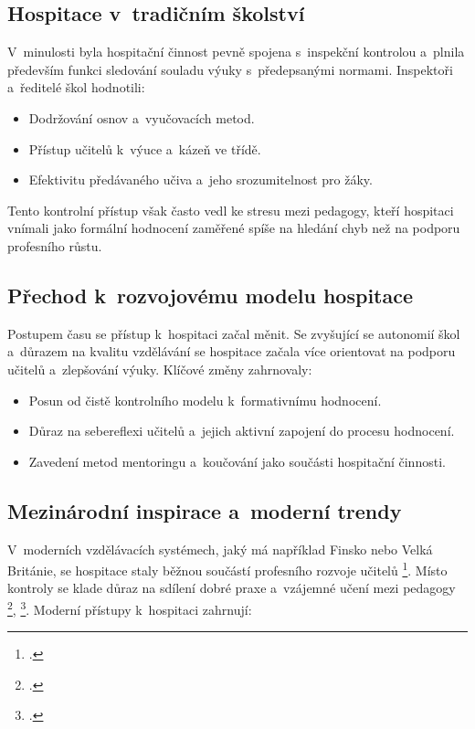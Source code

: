 \subsection{Hospitace v~tradičním školství}

V~minulosti byla hospitační činnost pevně spojena s~inspekční kontrolou a~plnila především funkci sledování souladu výuky s~předepsanými normami. Inspektoři a~ředitelé škol hodnotili:

\begin{itemize}
    \item Dodržování osnov a~vyučovacích metod.

    \item Přístup učitelů k~výuce a~kázeň ve třídě.
    
    \item Efektivitu předávaného učiva a~jeho srozumitelnost pro žáky.    
\end{itemize}

Tento kontrolní přístup však často vedl ke stresu mezi pedagogy, kteří hospitaci vnímali jako formální hodnocení zaměřené spíše na hledání chyb než na podporu profesního růstu.

\subsection{Přechod k~rozvojovému modelu hospitace}

Postupem času se přístup k~hospitaci začal měnit. Se zvyšující se autonomií škol a~důrazem na kvalitu vzdělávání se hospitace začala více orientovat na podporu učitelů a~zlepšování výuky. Klíčové změny zahrnovaly:

\begin{itemize}
    \item Posun od čistě kontrolního modelu k~formativnímu hodnocení.

    \item Důraz na sebereflexi učitelů a~jejich aktivní zapojení do procesu hodnocení.

    \item Zavedení metod mentoringu a~koučování jako součásti hospitační činnosti.
\end{itemize}

\subsection{Mezinárodní inspirace a~moderní trendy}

V~moderních vzdělávacích systémech, jaký má například Finsko nebo Velká Británie, se hospitace staly běžnou součástí profesního rozvoje učitelů \footcite{autoevaluace-zahranici}. Místo kontroly se klade důraz na sdílení dobré praxe a~vzájemné učení mezi pedagogy \footcite{ucime-ucit-se}, \footcite{metody-a-formy}. Moderní přístupy k~hospitaci zahrnují:

